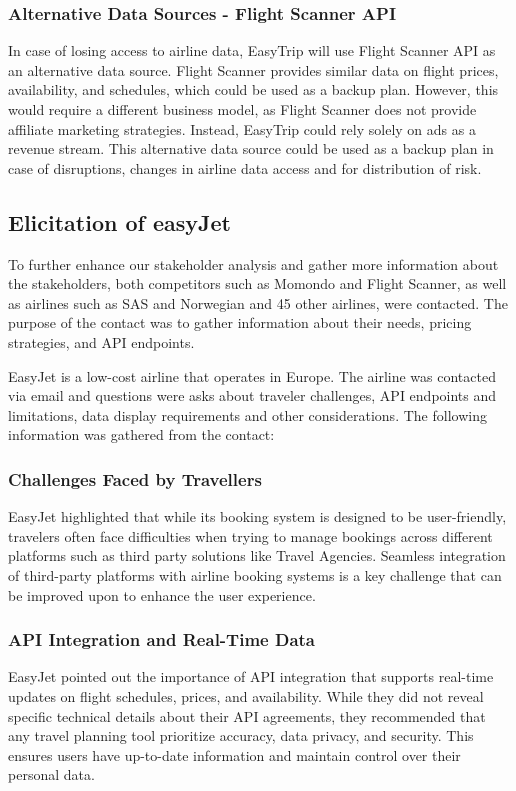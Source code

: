 \subsubsection{Alternative Data Sources - Flight Scanner API}
In case of losing access to airline data, EasyTrip will use Flight Scanner API as an alternative data source. Flight Scanner provides similar data on flight prices, availability, and schedules, which could be used as a backup plan. However, this would require a different business model, as Flight Scanner does not provide affiliate marketing strategies. Instead, EasyTrip could rely solely on ads as a revenue stream. This alternative data source could be used as a backup plan in case of disruptions, changes in airline data access and for distribution of risk.
\subsection{Elicitation of easyJet}
To further enhance our stakeholder analysis and gather more information about the stakeholders, both competitors such as Momondo and Flight Scanner, as well as airlines such as SAS and Norwegian and 45 other airlines, were contacted. The purpose of the contact was to gather information about their needs, pricing strategies, and API endpoints.

EasyJet is a low-cost airline that operates in Europe. The airline was contacted via email and questions were asks about traveler challenges, API endpoints and limitations, data display requirements and other considerations. The following information was gathered from the contact:
\subsubsection{Challenges Faced by Travellers}
EasyJet highlighted that while its booking system is designed to be user-friendly, travelers often face difficulties when trying to manage bookings across different platforms such as third party solutions like Travel Agencies. Seamless integration of third-party platforms with airline booking systems is a key challenge that can be improved upon to enhance the user experience.

\subsubsection{API Integration and Real-Time Data}
EasyJet pointed out the importance of API integration that supports real-time updates on flight schedules, prices, and availability. While they did not reveal specific technical details about their API agreements, they recommended that any travel planning tool prioritize accuracy, data privacy, and security. This ensures users have up-to-date information and maintain control over their personal data.

